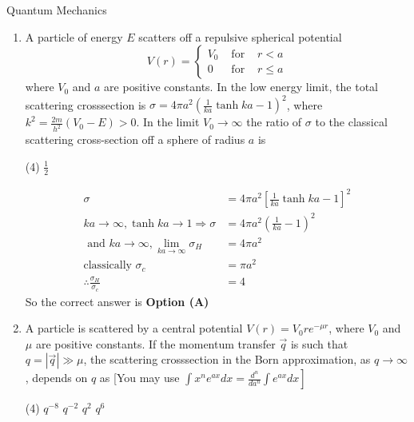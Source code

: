 \begin{abox}
	Quantum Mechanics
	\end{abox}
\begin{enumerate}
	\item A particle of energy $E$ scatters off a repulsive spherical potential
	$$
	V(r)=\left\{\begin{array}{ccc}
	V_{0} & \text { for } & r<a \\
	0 & \text { for } & r \leq a
	\end{array}\right.
	$$
	where $V_{0}$ and $a$ are positive constants. In the low energy limit, the total scattering crosssection is $\sigma=4 \pi a^{2}\left(\frac{1}{k a} \tanh k a-1\right)^{2}$, where $k^{2}=\frac{2 m}{h^{2}}\left(V_{0}-E\right)>0$. In the limit $V_{0} \rightarrow \infty$ the ratio of $\sigma$ to the classical scattering cross-section off a sphere of radius $a$ is
	{}
\begin{tasks}(4)
\task[\textbf{D.}] $\frac{1}{2}$
\end{tasks}
\begin{answer}
\begin{align*}
\sigma&=4 \pi a^{2}\left[\frac{1}{k a} \tanh k a-1\right]^{2}\\
k a \rightarrow \infty, \tanh k a \rightarrow 1 \Rightarrow \sigma&=4 \pi a^{2}\left(\frac{1}{k a}-1\right)^{2}\\
\text{	and }k a \rightarrow \infty, \lim _{k a \rightarrow \infty} \sigma_{H}&=4 \pi a^{2}\\
\text{classically }\sigma_{c}&=\pi a^{2}\\
\therefore \frac{\sigma_{H}}{\sigma_{c}}&=4
\end{align*}
So the correct answer is \textbf{Option (A)}
\end{answer}
\item A particle is scattered by a central potential $V(r)=V_{0} r e^{-\mu r}$, where $V_{0}$ and $\mu$ are positive constants. If the momentum transfer $\vec{q}$ is such that $q=|\vec{q}| \gg \mu$, the scattering crosssection in the Born approximation, as $q \rightarrow \infty$, depends on $q$ as
[You may use $\left.\int x^{n} e^{a x} d x=\frac{d^{n}}{d a^{n}} \int e^{a x} d x\right]$
{}
\begin{tasks}(4)
\task[\textbf{A.}] $q^{-8}$
\task[\textbf{B.}] $q^{-2}$
\task[\textbf{C.}] $q^{2}$
\task[\textbf{D.}] $q^{6}$
\end{tasks}
\begin{answer}

\end{answer}
\end{enumerate}
